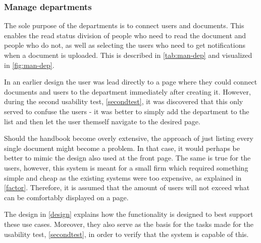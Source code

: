 \subsubsection{Manage departments}\label{managedepartments}
The sole purpose of the departments is to connect users and documents.
This enables the read status division of people who need to read the document and people who do not, as well as selecting the users who need to get notifications when a document is uploaded.
This is described in \cref{tab:man-dep} and visualized in \cref{fig:man-dep}.




In an earlier design the user was lead directly to a page where they could connect documents and users to the department immediately after creating it.
However, during the second usability test, \cref{secondtest}, it was discovered that this only served to confuse the users - it was better to simply add the department to the list and then let the user themself navigate to the desired page.

Should the handbook become overly extensive, the approach of just listing every single document might become a problem.
In that case, it would perhaps be better to mimic the design also used at the front page.
The same is true for the users, however, this system is meant for a small firm which required something simple and cheap as the existing systems were too expensive, as explained in \cref{factor}.
Therefore, it is assumed that the amount of users will not exceed what can be comfortably displayed on a page.

The design in \cref{design} explains how the functionality is designed to best support these use cases.
Moreover, they also serve as the basis for the tasks made for the usability test, \cref{secondtest}, in order to verify that the system is capable of this.
